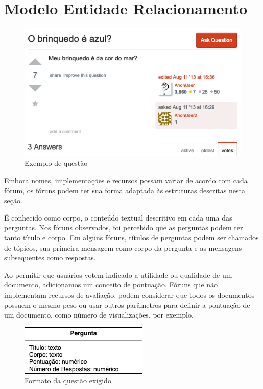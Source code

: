 \section{Modelo Entidade Relacionamento}
\label{mer}

\begin{figure}[htb]
	\centering
	\includegraphics[width=\textwidth]{chapters/project/question-brinquedo.png}
	\caption{Exemplo de questão}
	\label{fig:screenshootquestion}
\end{figure}
Embora nomes, implementações e recursos possam variar de acordo com cada fórum, os fóruns podem ter sua forma adaptada às estruturas descritas nesta seção. 

É conhecido como corpo, o conteúdo textual descritivo em cada uma das perguntas. Nos fóruns observados, foi percebido que as perguntas podem ter tanto título e corpo. Em alguns fóruns, títulos de perguntas podem ser chamados de tópicos, sua primeira mensagem como corpo da pergunta e as mensagens subsequentes como respostas.

Ao permitir que usuários votem indicado a utilidade ou qualidade de um documento, adicionamos um conceito de pontuação. Fóruns que não implementam recursos de avaliação, podem considerar que todos os documentos possuem o mesmo peso ou usar outros parâmetros para definir a pontuação de um documento, como número de visualizações, por exemplo.

\begin{figure}[htb]
	\centering
	\includegraphics[scale=1.0]{chapters/project/mer.png}
	\caption{Formato da questão exigido}
\end{figure}

